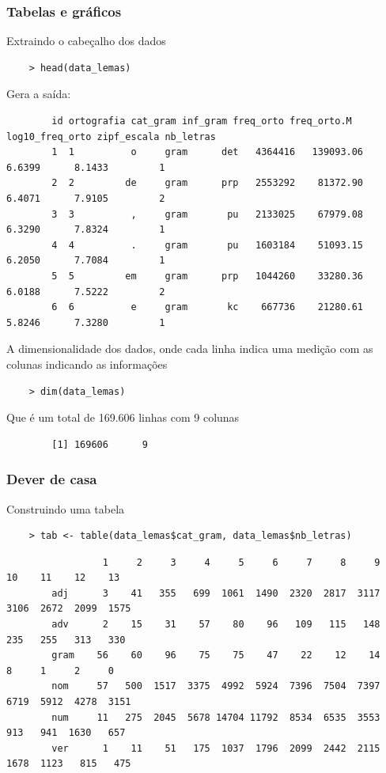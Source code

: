 \documentclass[graphics,14pt]{beamer}
\begin{document}
\begin{frame}[t,fragile=singleslide]
\frametitle{Tabelas e gráficos}
	Extraindo o cabeçalho dos dados
	\begin{lstlisting}
	> head(data_lemas)
	\end{lstlisting}
	Gera a saída:
	\begin{addmargin}[2.45cm]{0em}
		\normalsize 
		\begin{verbatim}
		id ortografia cat_gram inf_gram freq_orto freq_orto.M log10_freq_orto zipf_escala nb_letras
		1  1          o     gram      det   4364416   139093.06          6.6399      8.1433         1
		2  2         de     gram      prp   2553292    81372.90          6.4071      7.9105         2
		3  3          ,     gram       pu   2133025    67979.08          6.3290      7.8324         1
		4  4          .     gram       pu   1603184    51093.15          6.2050      7.7084         1
		5  5         em     gram      prp   1044260    33280.36          6.0188      7.5222         2
		6  6          e     gram       kc    667736    21280.61          5.8246      7.3280         1
		\end{verbatim}
	\end{addmargin}
	A dimensionalidade dos dados, onde cada linha indica uma medição com as colunas indicando as informações\\
	\begin{lstlisting}
	> dim(data_lemas)
	\end{lstlisting}
	Que é um total de 169.606 linhas com 9 colunas
	\begin{addmargin}[2cm]{0em}
	\normalsize 
	\begin{verbatim}
		[1] 169606      9
	\end{verbatim}
	\end{addmargin}

\end{frame}
\begin{frame}[t,fragile=singleslide]
	\frametitle{Dever de casa}
	Construindo uma tabela
	\begin{lstlisting}
	> tab <- table(data_lemas$cat_gram, data_lemas$nb_letras)
	\end{lstlisting}
	\vspace{2.0cm}

	\begin{addmargin}[2cm]{0em}
		\normalsize 
		\begin{verbatim}
		         1     2     3     4     5     6     7     8     9    10    11    12    13
		adj      3    41   355   699  1061  1490  2320  2817  3117  3106  2672  2099  1575
		adv      2    15    31    57    80    96   109   115   148   235   255   313   330
		gram    56    60    96    75    75    47    22    12    14     8     1     2     0
		nom     57   500  1517  3375  4992  5924  7396  7504  7397  6719  5912  4278  3151
		num     11   275  2045  5678 14704 11792  8534  6535  3553   913   941  1630   657
		ver      1    11    51   175  1037  1796  2099  2442  2115  1678  1123   815   475
		\end{verbatim}
	\end{addmargin}
	
\end{frame}
\end{document}

